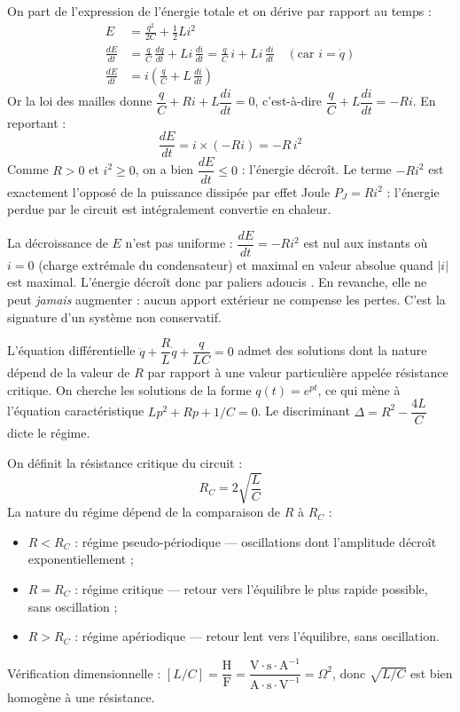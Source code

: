 \documentclass[11pt]{article}
\newcommand{\cle}[1]{{\popxbold\color{popdark}#1}}
\newcounter{popsec}
\newcounter{popsub}
\newcommand{\courssub}[1]{%
  \stepcounter{popsub}%
  \par\vspace{9pt}\noindent{\popxbold\fontsize{11.5}{13}\selectfont\color{popink}{\color{poporange}\thepopsec.\thepopsub}\hspace{6pt}#1}\par\nopagebreak\vspace{4pt}
}
\begin{document}
\begin{experience}
On part de l'expression de l'énergie totale et on dérive par rapport au temps :
\begin{align*}
E &= \frac{q^2}{2C} + \frac{1}{2}Li^2 \\
\frac{dE}{dt} &= \frac{q}{C}\,\frac{dq}{dt} + Li\,\frac{di}{dt} = \frac{q}{C}\,i + Li\,\frac{di}{dt} \quad (\text{car } i = \dot{q})\\
\frac{dE}{dt} &= i\left(\frac{q}{C} + L\,\frac{di}{dt}\right)
\end{align*}
Or la loi des mailles donne $\dfrac{q}{C} + Ri + L\dfrac{di}{dt} = 0$, c'est-à-dire $\dfrac{q}{C} + L\dfrac{di}{dt} = -Ri$. En reportant :
\[ \frac{dE}{dt} = i \times (-Ri) = -R\,i^2 \]
Comme $R > 0$ et $i^2 \geq 0$, on a bien $\dfrac{dE}{dt} \leq 0$ : l'énergie décroît. Le terme $-Ri^2$ est exactement l'opposé de la puissance dissipée par effet Joule $P_J = Ri^2$ : l'énergie perdue par le circuit est intégralement convertie en chaleur.
\end{experience}

\begin{attention}
La décroissance de $E$ n'est pas uniforme : $\dfrac{dE}{dt} = -Ri^2$ est nul aux instants où $i = 0$ (charge extrémale du condensateur) et maximal en valeur absolue quand $|i|$ est maximal. L'énergie décroît donc \og par paliers adoucis \fg{}. En revanche, elle ne peut \emph{jamais} augmenter : aucun apport extérieur ne compense les pertes. C'est la signature d'un système \cle{non conservatif}.
\end{attention}

\courssub{Les trois régimes d'évolution}

L'équation différentielle $\ddot{q} + \dfrac{R}{L}\dot{q} + \dfrac{q}{LC} = 0$ admet des solutions dont la nature dépend de la valeur de $R$ par rapport à une valeur particulière appelée \cle{résistance critique}. On cherche les solutions de la forme $q(t) = e^{pt}$, ce qui mène à l'équation caractéristique $Lp^2 + Rp + 1/C = 0$. Le discriminant $\Delta = R^2 - \dfrac{4L}{C}$ dicte le régime.

\begin{propriete}
On définit la résistance critique du circuit :
\[ R_C = 2\sqrt{\frac{L}{C}} \]
La nature du régime dépend de la comparaison de $R$ à $R_C$ :
\begin{itemize}
\item $R < R_C$ : régime \cle{pseudo-périodique} — oscillations dont l'amplitude décroît exponentiellement ;
\item $R = R_C$ : régime \cle{critique} — retour vers l'équilibre le plus rapide possible, sans oscillation ;
\item $R > R_C$ : régime \cle{apériodique} — retour lent vers l'équilibre, sans oscillation.
\end{itemize}
Vérification dimensionnelle : $[L/C] = \dfrac{\text{H}}{\text{F}} = \dfrac{\text{V}\cdot\text{s}\cdot\text{A}^{-1}}{\text{A}\cdot\text{s}\cdot\text{V}^{-1}} = \Omega^2$, donc $\sqrt{L/C}$ est bien homogène à une résistance.
\end{propriete}
\end{document}
